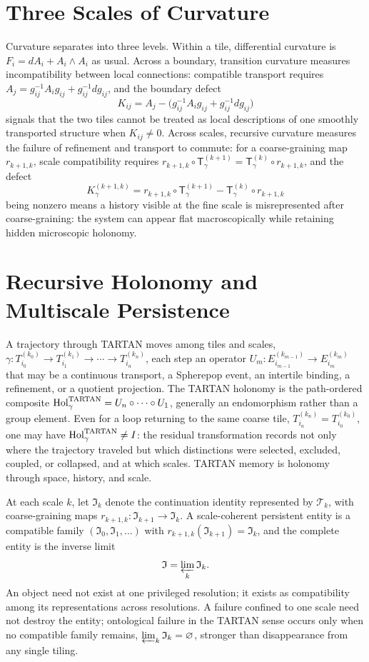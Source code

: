 \section{Three Scales of Curvature}

Curvature separates into three levels. Within a tile, differential curvature is $F_i = dA_i + A_i \wedge A_i$ as usual. Across a boundary, transition curvature measures incompatibility between local connections: compatible transport requires $A_j = g_{ij}^{-1} A_i g_{ij} + g_{ij}^{-1} dg_{ij}$, and the boundary defect
\[
K_{ij} = A_j - \bigl( g_{ij}^{-1} A_i g_{ij} + g_{ij}^{-1} dg_{ij} \bigr)
\]
signals that the two tiles cannot be treated as local descriptions of one smoothly transported structure when $K_{ij} \neq 0$. Across scales, recursive curvature measures the failure of refinement and transport to commute: for a coarse-graining map $r_{k+1,k}$, scale compatibility requires $r_{k+1,k} \circ \mathsf{T}^{(k+1)}_\gamma = \mathsf{T}^{(k)}_\gamma \circ r_{k+1,k}$, and the defect
\[
K_\gamma^{(k+1,k)} = r_{k+1,k} \circ \mathsf{T}^{(k+1)}_\gamma - \mathsf{T}^{(k)}_\gamma \circ r_{k+1,k}
\]
being nonzero means a history visible at the fine scale is misrepresented after coarse-graining: the system can appear flat macroscopically while retaining hidden microscopic holonomy.

\section{Recursive Holonomy and Multiscale Persistence}

A trajectory through TARTAN moves among tiles and scales, $\gamma : T_{i_0}^{(k_0)} \to T_{i_1}^{(k_1)} \to \cdots \to T_{i_n}^{(k_n)}$, each step an operator $U_m : E_{i_{m-1}}^{(k_{m-1})} \to E_{i_m}^{(k_m)}$ that may be a continuous transport, a Spherepop event, an intertile binding, a refinement, or a quotient projection. The TARTAN holonomy is the path-ordered composite $\operatorname{Hol}_\gamma^{\mathrm{TARTAN}} = U_n \circ \cdots \circ U_1$, generally an endomorphism rather than a group element. Even for a loop returning to the same coarse tile, $T_{i_n}^{(k_n)} = T_{i_0}^{(k_0)}$, one may have $\operatorname{Hol}_\gamma^{\mathrm{TARTAN}} \neq I$: the residual transformation records not only where the trajectory traveled but which distinctions were selected, excluded, coupled, or collapsed, and at which scales. TARTAN memory is holonomy through space, history, and scale.

At each scale $k$, let $\mathfrak{I}_k$ denote the continuation identity represented by $\mathcal{T}_k$, with coarse-graining maps $r_{k+1,k} : \mathfrak{I}_{k+1} \to \mathfrak{I}_k$. A scale-coherent persistent entity is a compatible family $(\mathfrak{I}_0, \mathfrak{I}_1, \ldots)$ with $r_{k+1,k}(\mathfrak{I}_{k+1}) = \mathfrak{I}_k$, and the complete entity is the inverse limit
\[
\mathfrak{I} = \varprojlim_k \mathfrak{I}_k.
\]
An object need not exist at one privileged resolution; it exists as compatibility among its representations across resolutions. A failure confined to one scale need not destroy the entity; ontological failure in the TARTAN sense occurs only when no compatible family remains, $\varprojlim_k \mathfrak{I}_k = \varnothing$, stronger than disappearance from any single tiling.

